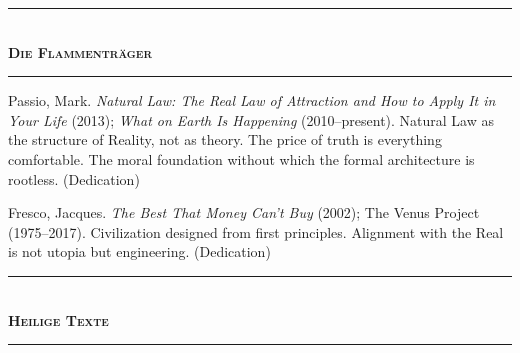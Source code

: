 \documentclass[10pt, openany, oneside]{book}
\renewcommand{\normalsize}{\fontsize{10}{13}\selectfont}
\renewcommand{\footnotesize}{\fontsize{8.5}{11}\selectfont}
\begin{document}
\vspace{1.5em}

\begin{center}
    \rule{0.3\textwidth}{0.4pt}\\[0.5em]
    {\normalsize\bfseries\scshape Die Flammenträger}\\[0.3em]
    \rule{0.3\textwidth}{0.4pt}
\end{center}

\vspace{1em}

{\footnotesize

\noindent Passio, Mark. \textit{Natural Law: The Real Law of Attraction and How to Apply It in Your Life} (2013); \textit{What on Earth Is Happening} (2010--present). Natural Law as the structure of Reality, not as theory. The price of truth is everything comfortable. The moral foundation without which the formal architecture is rootless. (Dedication)

\vspace{0.3em}

\noindent Fresco, Jacques. \textit{The Best That Money Can't Buy} (2002); The Venus Project (1975--2017). Civilization designed from first principles. Alignment with the Real is not utopia but engineering. (Dedication)

}

\vspace{1.5em}

\begin{center}
    \rule{0.3\textwidth}{0.4pt}\\[0.5em]
    {\normalsize\bfseries\scshape Heilige Texte}\\[0.3em]
    \rule{0.3\textwidth}{0.4pt}
\end{center}

\vspace{1em}
\end{document}
